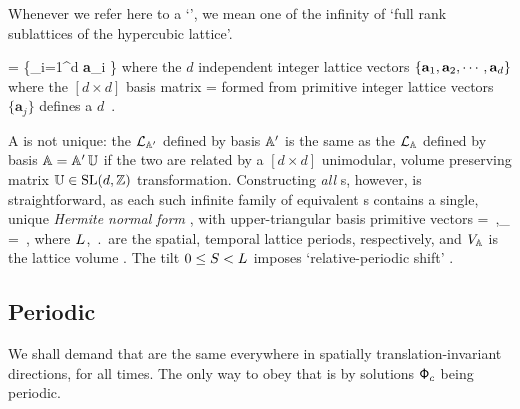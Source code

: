 \documentclass[11pt,a4paper]{article}
\begin{document}
Whenever we refer here to a `{\Blatt}', we mean one of the infinity of 
`full rank {sub}lattices of the hypercubic lattice'. 

{\Blatt}
\beq
\lattice = \Big\{\sum_{i=1}^d  {\bf a}_i
\;\vert\;  \in{} \Big\}
where the $d$ independent integer lattice vectors
\(
\{{\bf a}_1,{\bf a}_2,\cdots,{\bf a}_d\}
\) %
where the $[d\!\times\!d]$ basis matrix 
\beq
{} = 
formed from primitive integer lattice vectors $\{\mathbf{a}_j\}$ 
defines a $d$\dmn\ \emph{\pcell}.


A {\pcell} is not unique: the {\Blatt} 
$\mathcal{L}_{\mathbb{A}'}$ defined by basis $\mathbb{A}'$ is the same as the 
{\Blatt} $\mathcal{L}_{\mathbb{A}}$ defined by basis 
\( %
\Bcell{A}=\Bcell{A}'\,\Bcell{U} 
\) %
if the two are related by a $[d\!\times\!d]$ unimodular, volume 
preserving 
matrix  $\mathbb{U}\in\textrm{SL}(d,\mathbb{Z})$ 
transformation.
Constructing 
\emph{all} {\Blatt}s, however, is straightforward, as each such infinite 
family of equivalent {\pcell}s contains a single, unique \emph{Hermite 
	normal form} {\pcell}, with upper-triangular basis primitive 
vectors
\beq 
{} = 
\,,\qquad \vol_ = \speriod{} \period{}
\,, 
where ${L_{}}$, $\period{}$ are the spatial, 
temporal lattice periods, respectively, and ${V}_{\mathbb{A}}$ is the 
lattice {volume} . The tilt 
$0 \leq {\ensuremath{S_{}}}<{L_{}}$ imposes `relative-periodic shift' 
{\bcs}. 

\subsection{Periodic {\fconfs}}
\label{s:periodicCnfs} 

	We shall demand that {\ELe} are the same everywhere in spatially
	translation-invariant directions, for all times. 
	The only way to obey that is by solutions $\mathsf{\Phi}_c$  
	being periodic.
\end{document}
